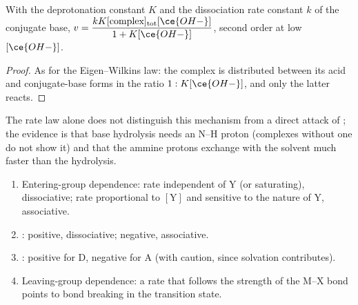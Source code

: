 \begin{proposition}\label{prop:b3:complex-mechanisms:conjugate-base}
With the deprotonation constant $K$ and the dissociation rate constant $k$ of the
conjugate base, $v = \dfrac{kK[\text{complex}]_{\mathrm{tot}}[\ce{OH-}]}{1 + K[\ce{OH-}]}$, second order at low $[\ce{OH-}]$.
\end{proposition}

\begin{proof}
As for the Eigen--Wilkins law: the complex is distributed between its acid and
conjugate-base forms in the ratio $1 : K[\ce{OH-}]$, and only the latter reacts.
\end{proof}

The rate law alone does not distinguish this mechanism from a direct attack of
; the evidence is that base hydrolysis needs an N--H proton (complexes without
one do not show it) and that the ammine protons exchange with the solvent much
faster than the hydrolysis.

\begin{method}\label{met:b3:complex-mechanisms:diagnose}
\begin{enumerate}
  \item Entering-group dependence: rate independent of Y (or saturating),
        dissociative; rate proportional to $[\mathrm Y]$ and sensitive to the nature of Y,
        associative.
  \item {}: positive, dissociative; negative, associative.
  \item {}: positive for D, negative for A (with caution, since
        solvation contributes).
  \item Leaving-group dependence: a rate that follows the strength of the M--X bond
        points to bond breaking in the transition state.
\end{enumerate}
\end{method}


